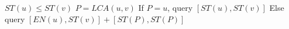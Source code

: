 $ST(u) \leq ST(v)$ \newline
$P = LCA(u, v)$ \newline
     If $P = u$, query $[ST(u), ST(v)]$ \newline
             Else query $[EN(u), ST(v)] + [ST(P), ST(P)]$
